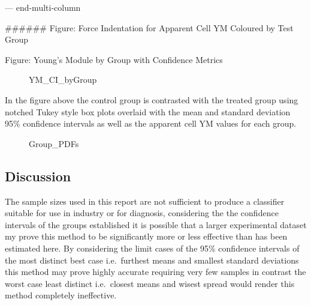 \documentclass[
  paper=a4,
  ,captions=tableheading
]{scrartcl}
\makeatletter
\newcommand*\pandocbounded[1]{%
  \sbox\pandoc@box{#1}%
  \Gscale@div\@tempa{\textheight}{\dimexpr\ht\pandoc@box+\dp\pandoc@box\relax}%
  \Gscale@div\@tempb{\linewidth}{\wd\pandoc@box}%
  \ifdim\@tempb\p@<\@tempa\p@\let\@tempa\@tempb\fi%
  \ifdim\@tempa\p@<\p@\scalebox{\@tempa}{\usebox\pandoc@box}%
  \else\usebox{\pandoc@box}%
  \fi%
}
\makeatother
\begin{document}
--- end-multi-column

\#\#\#\#\#\# Figure: Force Indentation for Apparent Cell YM Coloured by
Test Group

\pandocbounded{}

Figure: Young's Module by Group with Confidence Metrics

\begin{figure}
\centering
\pandocbounded{}
\caption{YM\_CI\_byGroup}
\end{figure}

In the figure above the control group is contrasted with the treated
group using notched Tukey style box plots overlaid with the mean and
standard deviation 95\% confidence intervals as well as the apparent
cell YM values for each group.

\begin{figure}
\centering
\pandocbounded{}
\caption{Group\_PDFs}
\end{figure}

\subsection{Discussion}\label{discussion}

The sample sizes used in this report are not sufficient to produce a
classifier suitable for use in industry or for diagnosis, considering
the the confidence intervals of the groups established it is possible
that a larger experimental dataset my prove this method to be
significantly more or less effective than has been estimated here. By
considering the limit cases of the 95\% confidence intervals of the most
distinct best case i.e.~furthest means and smallest standard deviations
this method may prove highly accurate requiring very few samples in
contrast the worst case least distinct i.e.~closest means and wisest
spread would render this method completely ineffective.
\end{document}
